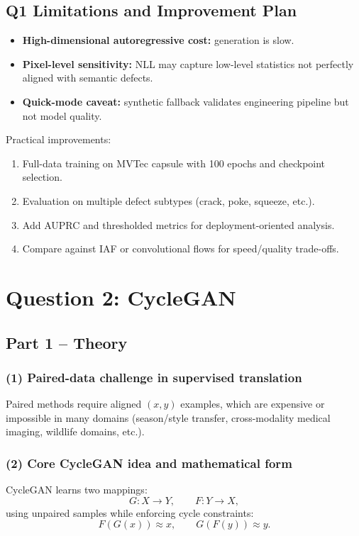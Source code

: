 \documentclass[conference]{IEEEtran}
\begin{document}
\subsection{Q1 Limitations and Improvement Plan}
\begin{itemize}
\item \textbf{High-dimensional autoregressive cost:} generation is slow.
\item \textbf{Pixel-level sensitivity:} NLL may capture low-level statistics not perfectly aligned with semantic defects.
\item \textbf{Quick-mode caveat:} synthetic fallback validates engineering pipeline but not model quality.
\end{itemize}
Practical improvements:
\begin{enumerate}
\item Full-data training on MVTec capsule with 100 epochs and checkpoint selection.
\item Evaluation on multiple defect subtypes (crack, poke, squeeze, etc.).
\item Add AUPRC and thresholded metrics for deployment-oriented analysis.
\item Compare against IAF or convolutional flows for speed/quality trade-offs.
\end{enumerate}

\section{Question 2: CycleGAN}

\subsection{Part 1 -- Theory}

\subsubsection{(1) Paired-data challenge in supervised translation}
Paired methods require aligned $(x,y)$ examples, which are expensive or impossible in many domains (season/style transfer, cross-modality medical imaging, wildlife domains, etc.).

\subsubsection{(2) Core CycleGAN idea and mathematical form}
CycleGAN learns two mappings:
\begin{equation}
G:X\to Y,\qquad F:Y\to X,
\end{equation}
using unpaired samples while enforcing cycle constraints:
\begin{equation}
F(G(x))\approx x,\qquad G(F(y))\approx y.
\end{equation}
\end{document}
